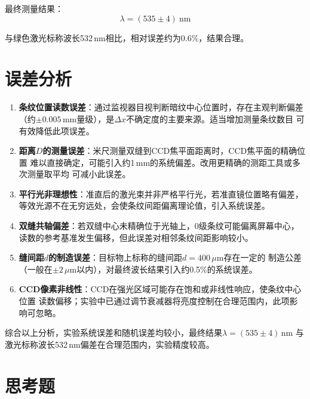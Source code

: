 \documentclass[12pt, a4paper]{article}
\begin{document}
最终测量结果：
\begin{equation}
  \boxed{\lambda = (535 \pm 4)\ \text{nm}}
\end{equation}

与绿色激光标称波长532\,nm相比，相对误差约为0.6\%，结果合理。

\section{误差分析}

\begin{enumerate}
  \item \textbf{条纹位置读数误差}：通过监视器目视判断暗纹中心位置时，存在主观判断偏差
        （约$\pm 0.005$\,mm量级），是$\Delta x$不确定度的主要来源。适当增加测量条纹数目
        可有效降低此项误差。

  \item \textbf{距离$D$的测量误差}：米尺测量双缝到CCD焦平面距离时，CCD焦平面的精确位置
        难以直接确定，可能引入约1\,mm的系统偏差。改用更精确的测距工具或多次测量取平均
        可减小此误差。

  \item \textbf{平行光非理想性}：准直后的激光束并非严格平行光，若准直镜位置略有偏差，
        等效光源不在无穷远处，会使条纹间距偏离理论值，引入系统误差。

  \item \textbf{双缝共轴偏差}：若双缝中心未精确位于光轴上，0级条纹可能偏离屏幕中心，
        读数的参考基准发生偏移，但此误差对相邻条纹间距影响较小。

  \item \textbf{缝间距$d$的制造误差}：目标物上标称的缝间距$d = 400\,\mu$m存在一定的
        制造公差（一般在$\pm 2\,\mu$m以内），对最终波长结果引入约0.5\%的系统误差。

  \item \textbf{CCD像素非线性}：CCD在强光区域可能存在饱和或非线性响应，使条纹中心位置
        读数偏移；实验中已通过调节衰减器将亮度控制在合理范围内，此项影响可忽略。
\end{enumerate}

综合以上分析，实验系统误差和随机误差均较小，最终结果$\lambda = (535 \pm 4)$\,nm
与激光标称波长532\,nm偏差在合理范围内，实验精度较高。

\section{思考题}
\end{document}
